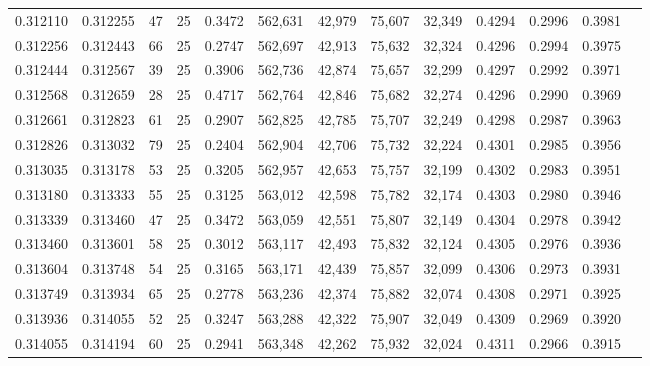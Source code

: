 \begin{tabular}{rrrrrrrrrrrrr}
0.312110 & 0.312255 &    47 &  25 &                                     0.3472 & 562,631 &  42,979 &  75,607 &  32,349 & 0.4294 & 0.2996 & 0.3981 \\
0.312256 & 0.312443 &    66 &  25 &                                     0.2747 & 562,697 &  42,913 &  75,632 &  32,324 & 0.4296 & 0.2994 & 0.3975 \\
0.312444 & 0.312567 &    39 &  25 &                                     0.3906 & 562,736 &  42,874 &  75,657 &  32,299 & 0.4297 & 0.2992 & 0.3971 \\
0.312568 & 0.312659 &    28 &  25 &                                     0.4717 & 562,764 &  42,846 &  75,682 &  32,274 & 0.4296 & 0.2990 & 0.3969 \\
0.312661 & 0.312823 &    61 &  25 &                                     0.2907 & 562,825 &  42,785 &  75,707 &  32,249 & 0.4298 & 0.2987 & 0.3963 \\
0.312826 & 0.313032 &    79 &  25 &                                     0.2404 & 562,904 &  42,706 &  75,732 &  32,224 & 0.4301 & 0.2985 & 0.3956 \\
0.313035 & 0.313178 &    53 &  25 &                                     0.3205 & 562,957 &  42,653 &  75,757 &  32,199 & 0.4302 & 0.2983 & 0.3951 \\
0.313180 & 0.313333 &    55 &  25 &                                     0.3125 & 563,012 &  42,598 &  75,782 &  32,174 & 0.4303 & 0.2980 & 0.3946 \\
0.313339 & 0.313460 &    47 &  25 &                                     0.3472 & 563,059 &  42,551 &  75,807 &  32,149 & 0.4304 & 0.2978 & 0.3942 \\
0.313460 & 0.313601 &    58 &  25 &                                     0.3012 & 563,117 &  42,493 &  75,832 &  32,124 & 0.4305 & 0.2976 & 0.3936 \\
0.313604 & 0.313748 &    54 &  25 &                                     0.3165 & 563,171 &  42,439 &  75,857 &  32,099 & 0.4306 & 0.2973 & 0.3931 \\
0.313749 & 0.313934 &    65 &  25 &                                     0.2778 & 563,236 &  42,374 &  75,882 &  32,074 & 0.4308 & 0.2971 & 0.3925 \\
0.313936 & 0.314055 &    52 &  25 &                                     0.3247 & 563,288 &  42,322 &  75,907 &  32,049 & 0.4309 & 0.2969 & 0.3920 \\
0.314055 & 0.314194 &    60 &  25 &                                     0.2941 & 563,348 &  42,262 &  75,932 &  32,024 & 0.4311 & 0.2966 & 0.3915 \\

\end{tabular}
